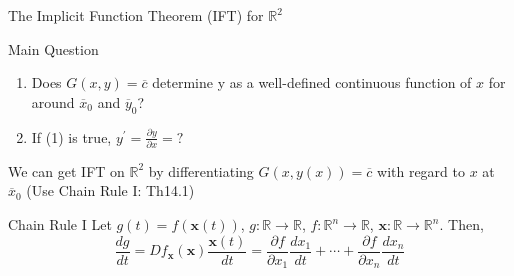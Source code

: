 \documentclass[final]{beamer}
\newcommand{\bb}{\mathbb}
\newcommand{\bd}{\mathbf}
\newcommand{\p}{\partial}
\begin{document}
\begin{frame}[t]{The Implicit Function Theorem (IFT) for $\bb{R}^2$}
	\begin{block}
		{Main Question}
		\begin{enumerate}
			\item Does $G(x,y)=\overline c$ determine y as a well-defined continuous function of $x$ for around $\overline x_0$ and $\overline y_0$?
			\item If (1) is true, $y^\prime = \frac{\p y}{\p x}=?$
		\end{enumerate}
	\end{block}
	We can get IFT on $\bb{R}^2$ by differentiating $G(x,y(x))=\overline c$ with regard to $x$ at $\overline x_0$ (Use Chain Rule I: Th14.1)
	\begin{block}
		{Chain Rule I}
		Let $g(t)=f(\bd{x}(t))$, $g:\bb{R}\rightarrow\bb{R}$, $f:\bb{R}^n\rightarrow\bb{R}$, $\bd x :\bb{R}\rightarrow\bb{R}^n$. Then, \[
			\frac{d g}{dt} = Df_{\bd x}(\bd x) \frac {\bd x(t)}{dt} = \frac{\p f}{\p x_1}\frac{dx_1}{dt}+ \cdots +\frac{\p f}{\p x_n}\frac{dx_n}{dt}
		\]
	\end{block}
\end{frame}
\end{document}

